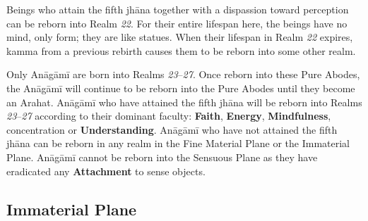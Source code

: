 Beings who attain the fifth jhāna together with a dispassion toward perception can be reborn into Realm \textit{22}. For their entire lifespan here, the beings have no mind, only form; they are like statues. When their lifespan in Realm \textit{22} expires, kamma from a previous rebirth causes them to be reborn into some other realm.

Only Anāgāmī are born into Realms \textit{23}--\textit{27}. Once reborn into these Pure Abodes, the Anāgāmī will continue to be reborn into the Pure Abodes until they become an Arahat. Anāgāmī who have attained the fifth jhāna will be reborn into Realms \textit{23}--\textit{27} according to their dominant faculty: \textbf{Faith}, \textbf{Energy}, \textbf{Mindfulness}, concentration or \textbf{Understanding}. Anāgāmī who have not attained the fifth jhāna can be reborn in any realm in the Fine Material Plane or the Immaterial Plane. Anāgāmī cannot be reborn into the Sensuous Plane as they have eradicated any \textbf{Attachment} to sense objects.

\subsection*{Immaterial Plane}

